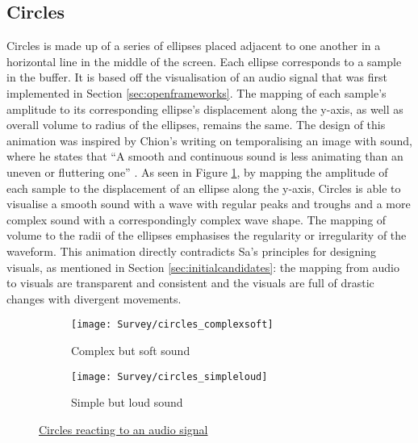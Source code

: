 \documentclass[../initial_thesis.tex]{subfiles}
\begin{document}
\subsection{Circles}
Circles is made up of a series of ellipses placed adjacent to one another in a horizontal line in the middle of the screen. Each ellipse corresponds to a sample in the buffer. It is based off the visualisation of an audio signal that was first implemented in Section \ref{sec:openframeworks}. The mapping of each sample's amplitude to its corresponding ellipse's displacement along the y-axis, as well as overall volume to radius of the ellipses, remains the same. The design of this animation was inspired by Chion's writing on temporalising an image with sound, where he states that ``A smooth and continuous sound is less animating than an uneven or fluttering one'' \cite{Chion1994}. As seen in Figure \ref{fig:circles1}, by mapping the amplitude of each sample to the displacement of an ellipse along the y-axis, Circles is able to visualise a smooth sound with a wave with regular peaks and troughs and a more complex sound with a correspondingly complex wave shape. The mapping of volume to the radii of the ellipses emphasises the regularity or irregularity of the waveform. This animation directly contradicts Sa's principles for designing visuals, as mentioned in Section \ref{sec:initialcandidates}: the mapping from audio to visuals are transparent and consistent and the visuals are full of drastic changes with divergent movements.

\begin{figure}
  \begin{subfigure}{0.5\textwidth}
    \texttt{[image: Survey/circles\_complexsoft]}
    \caption{Complex but soft sound}
  \end{subfigure} 
  \begin{subfigure}{0.5\textwidth}
    \texttt{[image: Survey/circles\_simpleloud]}
    \caption{Simple but loud sound}
  \end{subfigure}
  \caption{\href{https://vimeo.com/326765323}{Circles reacting to an audio signal}}
  \label{fig:circles1}
\end{figure}
\end{document}
